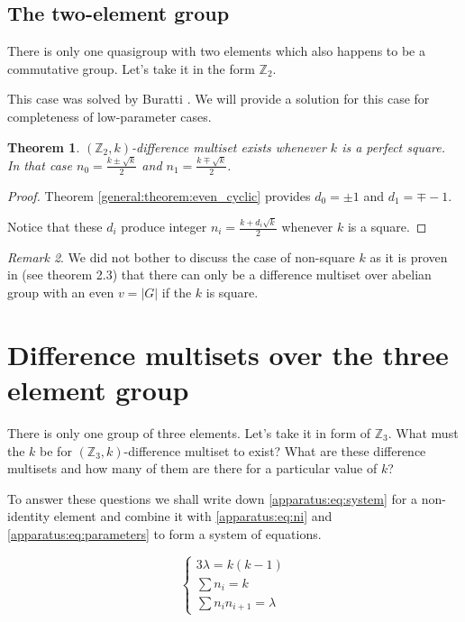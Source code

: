 \documentclass{article}
\theoremstyle{plain}
\newtheorem{theorem}{Theorem}[section]
\theoremstyle{definition}
\theoremstyle{remark}
\newtheorem{remark}[theorem]{Remark}
\begin{document}
		\subsection{The two-element group}
			There is only one quasigroup with two elements which also happens to be a commutative group. Let's take it in the form $\mathbb Z_2$.
		
			This case was solved by Buratti \cite{buratti1999old}. We will provide a solution for this case for completeness of low-parameter cases.
			
			\begin{theorem}
				$(\mathbb Z_2,k)$-difference multiset exists whenever $k$ is a perfect square. In that case $n_0 = \frac{k \pm \sqrt k}{2}$ and $n_1 = \frac{k \mp \sqrt k}{2}$.
			\end{theorem}
			\begin{proof}
                Theorem \ref{general:theorem:even_cyclic} provides $d_0 = \pm 1$ and $d_1 = \mp -1$.
                
                Notice that these $d_i$ produce integer $n_i = \frac{k + d_i \sqrt k}2$ whenever $k$ is a square.
			\end{proof}
			
			\begin{remark}
                We did not bother to discuss the case of non-square $k$ as it is proven in \cite{arasu2005cyclic} (see theorem 2.3) that there can only be a difference multiset over abelian group with an even $v=|G|$ if the $k$ is square.
			\end{remark}

	\section{Difference multisets over the three element group}
		There is only one group of three elements. Let's take it in form of $\mathbb Z_3$. What must the $k$ be for $(\mathbb Z_3,k)$-difference multiset to exist? What are these difference multisets and how many of them are there for a particular value of $k$?
		
		To answer these questions we shall write down \eqref{apparatus:eq:system} for a non-identity element and combine it with \eqref{apparatus:eq:ni} and \eqref{apparatus:eq:parameters} to form a system of equations.
		
		\begin{equation}
			\label{v3:eq:constraints}
			\begin{cases}
				3\lambda = k(k-1) \\
				\sum n_i = k \\
				\sum n_i n_{i+1} = \lambda
			\end{cases}
		\end{equation}
		
\end{document}
